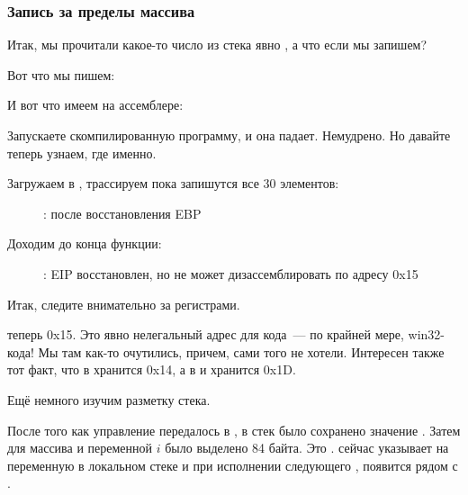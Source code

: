 \subsubsection{Запись за пределы массива}

Итак, мы прочитали какое-то число из стека явно , а что если мы запишем?

Вот что мы пишем:




И вот что имеем на ассемблере:



Запускаете скомпилированную программу, и она падает. Немудрено. Но давайте теперь узнаем, где именно.

\clearpage
\myindex{\olly}

Загружаем в \olly, трассируем пока запишутся все 30 элементов:

\begin{figure}[H]
\centering
{}
\caption{\olly: после восстановления EBP}
\label{fig:array_BO_olly_w1}
\end{figure}

\clearpage
Доходим до конца функции:

\begin{figure}[H]
\centering
{}
\caption{\olly: EIP восстановлен, но \olly не может дизассемблировать по адресу 0x15}
\label{fig:array_BO_olly_w2}
\end{figure}

Итак, следите внимательно за регистрами.

\EIP теперь 0x15. Это явно нелегальный адрес для кода~--- по крайней мере, win32-кода! 
Мы там как-то очутились, причем, сами того не хотели. Интересен также тот факт, что в \EBP хранится 0x14, 
а в \ECX и \EDX хранится 0x1D.

Ещё немного изучим разметку стека.

После того как управление передалось в \main, в стек было сохранено значение \EBP. 
Затем для массива и переменной $i$ было выделено 84 байта. Это . 
\ESP сейчас указывает на переменную  в локальном стеке и при исполнении следующего , 
 появится рядом с .

